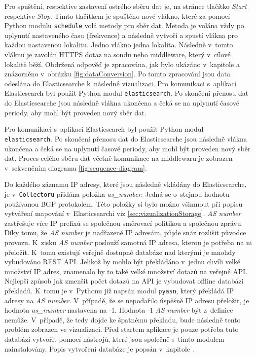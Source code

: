 \documentclass[thesis=M,czech]{src/FITthesis}[2019/12/23]
\begin{document}
Pro spuštění, respektive zastavení ostrého sběru dat je, na stránce tlačítko \textit{Start} respektive \textit{Stop}. Tímto tlačítkem je spuštěno nové vlákno, které za pomocí Python modulu \texttt{schedule} volá metody pro sběr dat. Metoda je volána vždy po uplynutí nastaveného času (frekvence) a následně vytvoří a spustí vlákna pro každou nastavenou lokalitu. Jedno vlákno jedna lokalita. Následně v~tomto vláknu je zavolán HTTPS dotaz na sondu nebo middleware, který v~cílové lokalitě běží. Obdržená odpověď je zpracována, jak bylo ukázáno v~kapitole  a znázorněno v~obrázku \ref{fig:dataConversion}. Po tomto zpracování jsou data odeslána do Elasticsearche k~následné vizualizaci. Pro komunikaci s~aplikací Elasticsearch byl použit Python modul \texttt{elasticsearch}. Po skončení přenosu dat do Elasticsearche jsou následně vlákna ukončena a čeká se na uplynutí časové periody, aby mohl být proveden nový sběr dat. 

Pro komunikaci s~aplikací Elasticsearch byl použit Python modul \linebreak \texttt{elasticsearch}. Po skončení přenosu dat do Elasticsearche jsou následně vlákna ukončena a čeká se na uplynutí časové periody, aby mohl být proveden nový sběr dat. Proces celého sběru dat včetně komunikace na middlewaru je zobrazen v~sekvenčním diagramu \ref{fig:sequence-diagram}.

Do každého záznamu IP adresy, které jsou následně vkládány do Elasticsearche, je v~\texttt{Collectoru} přidána položka \textit{as\_number}. Jedná se o~stejnou hodnotu používanou BGP protokolem. Této položky si bylo možno všimnout při popisu vytváření mapování v~Elasticsearchi viz \ref{sec:vizualizationStorage}. \textit{AS number} zastřešuje více IP prefixů se společnou směrovací politikou a společnou zprávu. Díky tomu, že \textit{AS number} je nadřazené IP adresám, půjde snáz rozlišit původce provozu. K~zisku \textit{AS number} poslouží samotná IP adresa, kterou je potřeba na ni přeložit. K~tomu existují veřejně dostupné databáze nad kterými je mnohdy vybudováno REST API. Jelikož by mohlo být překládáno v~jednu chvíli velké množství IP adres, znamenalo by to také velké množství dotazů na veřejné API. Nejlepší způsob jak zmenšit počet dotazů na API je vybudovat offline databázi překladů. K~tomu je v~Pythonu již napsán modul \texttt{pyasn}, který překládá IP adresy na \textit{AS number}. V~případě, že se nepodařilo úspěšně IP adresu přeložit, je hodnota \textit{as\_number} nastavena na -1. Hodnota -1 \textit{AS number} být z~definice nemůže. V~případě, že tedy dojde ke špatnému překladu, bude následně tento problém zobrazen ve vizualizaci. Před startem aplikace je pouze potřeba tuto databázi vytvořit pomocí nástrojů, které jsou společně s~tímto modulem nainstalovány. Popis vytvoření databáze je popsán v~kapitole \textit{}.
\end{document}
